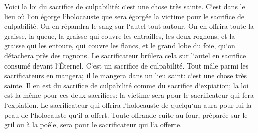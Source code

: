 \verse Voici la loi du sacrifice de culpabilité: c`est une chose très sainte. 
\verse C`est dans le lieu où l`on égorge l`holocauste que sera égorgée la victime pour le sacrifice de culpabilité. On en répandra le sang sur l`autel tout autour. 
\verse On en offrira toute la graisse, la queue, la graisse qui couvre les entrailles, 
\verse les deux rognons, et la graisse qui les entoure, qui couvre les flancs, et le grand lobe du foie, qu`on détachera près des rognons. 
\verse Le sacrificateur brûlera cela sur l`autel en sacrifice consumé devant l`Éternel. C`est un sacrifice de culpabilité. 
\verse Tout mâle parmi les sacrificateurs en mangera; il le mangera dans un lieu saint: c`est une chose très sainte. 
\verse Il en est du sacrifice de culpabilité comme du sacrifice d`expiation; la loi est la même pour ces deux sacrifices: la victime sera pour le sacrificateur qui fera l`expiation. 
\verse Le sacrificateur qui offrira l`holocauste de quelqu`un aura pour lui la peau de l`holocauste qu`il a offert. 
\verse Toute offrande cuite au four, préparée sur le gril ou à la poêle, sera pour le sacrificateur qui l`a offerte. 
